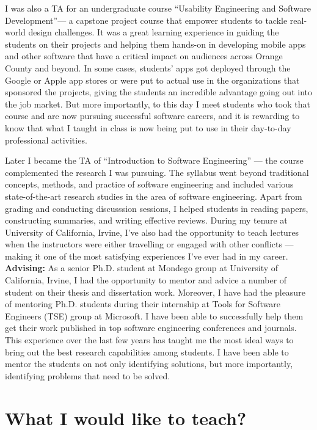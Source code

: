 \documentclass[a4paper]{article}
\begin{document}
I was also a TA for an undergraduate course \enquote{Usability Engineering and Software Development}--- a capstone project course that empower students to tackle real-world design challenges.
It was a great learning experience in guiding the students on their projects and helping them hands-on in developing mobile apps and other software that have a critical impact on audiences across Orange County and beyond. 
In some cases, students’ apps got deployed through the Google or Apple app stores or were put to actual use in the organizations that sponsored the projects, giving the students an incredible advantage going out into the job market.
But more importantly, to this day I meet students who took that course and are now pursuing successful software careers, and it is rewarding to know that what I taught in class is now being put to use in their day-to-day professional activities. 

Later I became the TA of \enquote{Introduction to Software Engineering} --- the course complemented the research I was pursuing. The syllabus went beyond traditional concepts, methods, and  practice of software engineering and included various state-of-the-art research studies in the area of software engineering. Apart from grading and conducting discusssion sessions, I helped students in reading papers, constructing summaries, and writing effective reviews.  During my tenure at University of California, Irvine, I've also had the opportunity to teach lectures when the instructors were either travelling or engaged with other conflicts --- making it one of the most satisfying experiences I've ever had in my career. \\

\noindent \textbf{Advising:} As a senior Ph.D. student at Mondego group at University of California, Irvine, I had
the opportunity to mentor and advice a number of student on their thesis and dissertation work.
Moreover, I have had the pleasure of mentoring Ph.D. students during their internship at Tools for Software Engineers (TSE) group at Microsoft.
I have been able to successfully help them get their work published in top software engineering conferences and journals. 
This experience over the last few years has taught me the most ideal ways to bring out the best research capabilities among students. I have
been able to mentor the students on not only identifying solutions, but more importantly, identifying problems that need to be solved.

\section*{What I would like to teach?}
\end{document}
